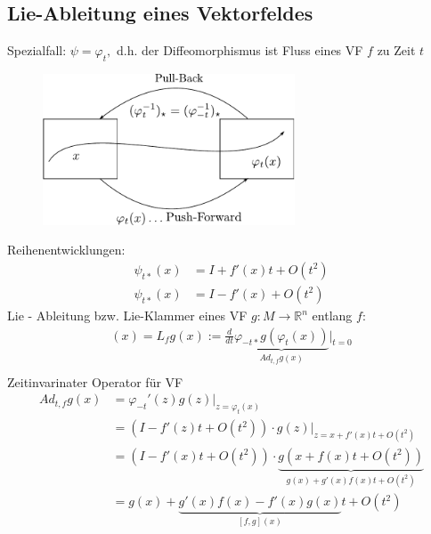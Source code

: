 \documentclass[ngerman]{tudscrreprt}
\begin{document}
\subsection{Lie-Ableitung eines Vektorfeldes}
Spezialfall: $\psi = \varphi_t,$ d.h. der Diffeomorphismus ist Fluss eines VF $f$ zu Zeit $t$ 
\begin{figure}[H]
\centering
\def\svgwidth{200pt} 
  \includegraphics[width=7.5cm]{im3122.pdf}
\end{figure}
Reihenentwicklungen:
\begin{align*}
\psi_{t*}(x) &= I + f'(x)t + O(t^2)\\ 
\psi_{t*}(x) &= I- f'(x) + O(t^2)
\end{align*}
Lie - Ableitung bzw. Lie-Klammer eines VF $g: M\to \mathbb{R}^n$ entlang $f:$
\begin{align*}
[ f,g](x) = L_fg(x) := \frac{d}{dt}\underbrace{\varphi_{-t*}g(\varphi_t(x))}_{Ad_{t,f}g(x)}|_{t=0}\\ 
\end{align*}
Zeitinvarinater Operator für VF\\ 
\begin{align*}
Ad_{t,f}g(x)&=\varphi_{-t}'(z) g(z)|_{z=\varphi_t(x)}\\ 
&=(I - f'(z)t+ O(t^2))\cdot g(z)|_{z= x+ f'(x)t+ O(t^2)}\\ 
&=(I - f'(x)t+ O(t^2))\cdot \underbrace{g(x+ f(x)t + O(t^2) ) }_{g(x) + g'(x)f(x)t+ O(t^2) }\\ 
&=g(x) + \underbrace{g'(x)f(x) - f'(x)g(x) }_{[f,g](x)}t + O(t^2)
\end{align*}
\end{document}
